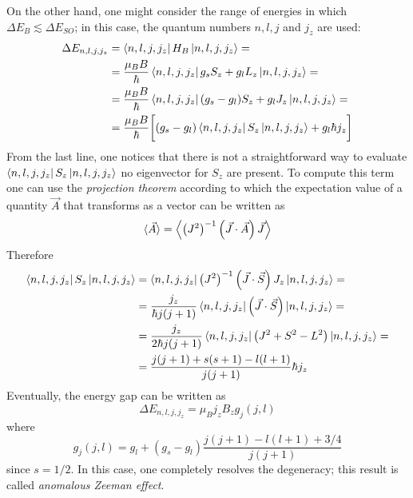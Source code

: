 On the other hand, one might consider the range of energies in which $\Delta E_B \lesssim \Delta E_{SO}$; in this case, the quantum numbers $n,l,j$ and $j_z$ are used:
\begin{align*}
\Delta E_{n,l,j,j_z} & = \bra{n,l,j,j_z} H_B \ket{n,l,j,j_z} =\\
& = \frac{\mu_B B}{\hbar} \bra{n,l,j,j_z} g_sS_z + g_lL_z \ket{n,l,j,j_z} = \\
& = \frac{\mu_B B}{\hbar} \bra{n,l,j,j_z}  (g_s-g_l)S_z + g_lJ_z \ket{n,l,j,j_z} = \\
&= \frac{\mu_B B}{\hbar} \bigg[ (g_s-g_l)\bra{n,l,j,j_z}S_z\ket{n,l,j,j_z} + g_l\hbar j_z \bigg]
\end{align*}
From the last line, one notices that there is not a straightforward way to evaluate $\bra{n,l,j,j_z}S_z\ket{n,l,j,j_z}$ no eigenvector for $S_z$ are present. To compute this term one can use the \textit{projection theorem} according to which the expectation value of a quantity $\vec{A}$ that transforms as a vector can be written as
\begin{equation*}
\langle \vec A \rangle = \Bigl\langle \left(J^2\right)^{-1} \left( \vec{J}\cdot \vec{A}\right) \vec{J} \Bigr\rangle
\end{equation*}
Therefore
\begin{equation*}
\begin{aligned}
\bra{n,l,j,j_z}S_z\ket{n,l,j,j_z} & =
\bra{n,l,j,j_z}  
\left({J}^2\right)^{-1}
\left( {\vec{J}\cdot\vec{S}} \right)
{J_z}
\ket{n,l,j,j_z} =  \\
& = \frac{j_z}{\hbar j(j+1)} \bra{n,l,j,j_z} \left( {\vec{J}\cdot\vec{S}} \right) \ket{n,l,j,j_z} = \\
& = \frac{j_z}{2 \hbar j(j+1)} \bra{n,l,j,j_z} \left( {J}^2 + {S}^2 - {L}^2\right) \ket{n,l,j,j_z} = \\
& =  \frac{j(j+1)+s(s+1)-l(l+1)}{j(j+1)} \hbar j_z
\end{aligned}
\end{equation*}
Eventually, the energy gap can be written as 
\begin{equation}
\Delta E_{n,l,j,j_z} = \mu_B j_z B_z g_j(j,l)
\label{eq:degrem}
\end{equation}
where 
$$g_j(j,l) = g_l + (g_s-g_l) \frac{j(j+1)-l(l+1) + 3/4}{j(j+1)}$$
since $s=1/2$. 
In this case, one completely resolves the degeneracy; this result is called \textit{anomalous Zeeman effect}. 

